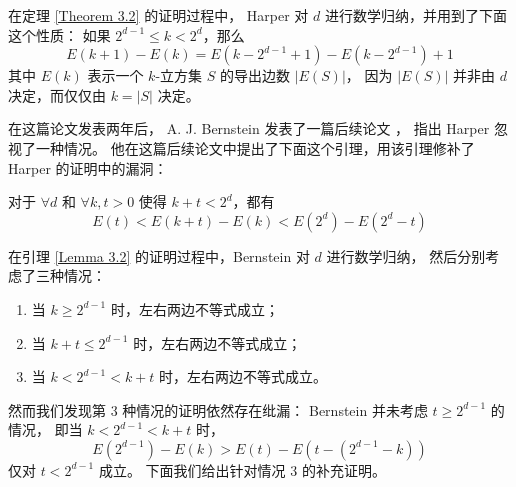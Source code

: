 在定理 \ref{Theorem 3.2} 的证明过程中，
Harper 对 $d$ 进行数学归纳，并用到了下面这个性质：
如果 $2^{d - 1} \le k < 2^d$，那么
\begin{equation*}
E(k + 1) - E(k) = E(k - 2^{d - 1} + 1) - E(k - 2^{d - 1}) + 1
\end{equation*}
其中 $E(k)$ 表示一个 $k$-立方集 $S$ 的导出边数 $|E(S)|$，
因为 $|E(S)|$ 并非由 $d$ 决定，而仅仅由 $k = |S|$ 决定。

在这篇论文发表两年后，
A. J. Bernstein 发表了一篇后续论文 \cite{Bernstein.1967}，
指出 Harper 忽视了一种情况。
他在这篇后续论文中提出了下面这个引理，用该引理修补了 Harper 的证明中的漏洞：

\begin{lemma}
\label{Lemma 3.2}
对于 $\forall d$ 和 $\forall k, t > 0$ 使得 $k + t < 2^d$，都有
\begin{equation*}
E(t) < E(k + t) − E(k) < E(2^d) − E(2^d − t)
\end{equation*}
\end{lemma}

在引理 \ref{Lemma 3.2} 的证明过程中，Bernstein 对 $d$ 进行数学归纳，
然后分别考虑了三种情况：
\begin{enumerate}[(1)]
	\item 当 $k \ge 2^{d − 1}$ 时，左右两边不等式成立；
	\item 当 $k + t \le 2^{d − 1}$ 时，左右两边不等式成立；
	\item 当 $k < 2^{d - 1} < k + t$ 时，左右两边不等式成立。
\end{enumerate}

然而我们发现第 3 种情况的证明依然存在纰漏：
Bernstein 并未考虑 $t \ge 2^{d − 1}$ 的情况，
即当 $k < 2^{d − 1} < k + t$ 时，
\begin{equation*}
E(2^{d − 1}) − E(k) > E(t) − E(t − (2^{d − 1} − k))
\end{equation*}
仅对 $t < 2^{d - 1}$ 成立。
下面我们给出针对情况 3 的补充证明。

